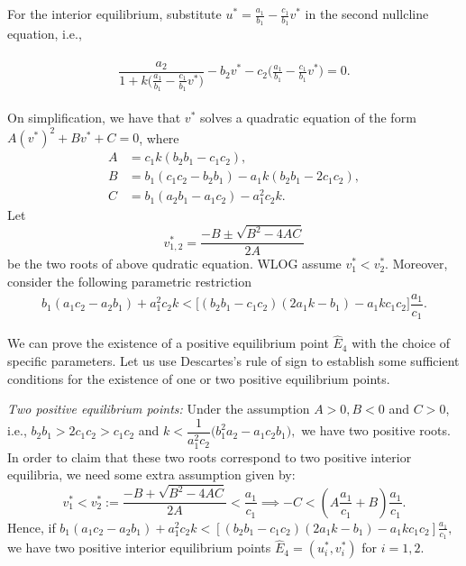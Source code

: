 \documentclass[10pt]{amsart}
\theoremstyle{definition}
\begin{document}
	For the interior equilibrium, substitute $u^*=\frac{a_1}{b_1} - \frac{c_1}{b_1} v^*$ in the second nullcline equation, i.e.,
	
	\begin{align*}
		\begin{split}
			\dfrac{a_2 }{1+k \Big( \frac{a_1}{b_1} - \frac{c_1}{b_1} v^*\Big) }  -b_2 v^* -c_2 \Big(\frac{a_1}{b_1} - \frac{c_1}{b_1} v^*\Big) =0.
		\end{split}
	\end{align*}
	
	On simplification, we have that $v^*$ solves a quadratic equation of the form
	$A(v^*)^2+Bv^*+C=0$, where 
	\begin{equation}\label{quad_param}
		\begin{split}
			A&=c_1 k(b_2 b_1 -c_1 c_2),\\
			B&=b_1(c_1 c_2-b_2 b_1)-a_1k(b_2 b_1-2c_1 c_2),\\
			C&=b_1(a_2 b_1 -a_1 c_2)-a_1^2 c_2 k.
		\end{split}
	\end{equation}
	Let 
	\begin{equation}\label{quad_roots}
			v_{1,2}^* = \frac{-B \pm \sqrt{B^2-4AC}}{2A}
	\end{equation}
   be the two roots of above qudratic equation. WLOG assume $v_1^*<v_2^*.$  Moreover, consider the following parametric restriction
	 \begin{align}\label{pos_u_null}
		b_1(a_1 c_2-a_2 b_1)+a_1^2 c_2 k < \Big[ (b_2 b_1 -c_1 c_2)(2 a_1k-b_1) -a_1kc_1 c_2 \Big] \dfrac{a_1}{c_1}.
	\end{align}
	
	We can prove the existence of a positive equilibrium point $\widehat{E}_4$ with the choice of specific parameters. Let us use Descartes's rule of sign to establish some sufficient conditions for the existence of one or two positive equilibrium points.
	
	\textit{Two positive equilibrium points:} Under the assumption $A>0,B<0$ and $C>0$, i.e., $b_2b_1>2c_1c_2>c_1c_2$ and $k<\dfrac{1}{a_1^2c_2} \Big( b_1^2a_2-a_1c_2b_1\Big),$ we have two positive roots. In order to claim that these two roots correspond to two positive interior equilibria, we need some extra assumption given by:
	\[ v_1^*<v_2^*:=\dfrac{-B + \sqrt{B^2-4AC}}{2A} < \dfrac{a_1}{c_1} \implies -C < (A \dfrac{a_1}{c_1}+B)\dfrac{a_1}{c_1}.\]
	Hence, if $b_1(a_1 c_2-a_2 b_1)+a_1^2 c_2 k < [ (b_2 b_1 -c_1 c_2)(2 a_1k-b_1) -a_1kc_1 c_2] \frac{a_1}{c_1},$ we have two positive interior equilibrium points $\widehat{E}_4=(u_i^*,v_i^*)$ for $i=1,2$.
	
\end{document}
